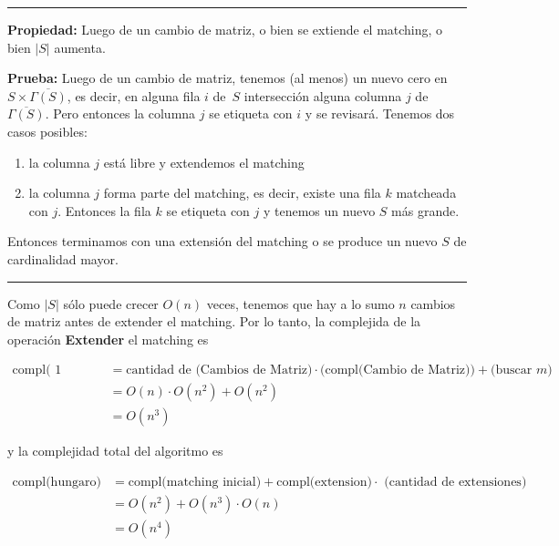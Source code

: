 \documentclass[10pt,a4paper]{article}
\begin{document}
\vspace{0.5cm}\hrule\vspace{0.5cm}
\textbf{Propiedad: }Luego de un cambio de matriz, o bien se extiende el matching, o bien $\lvert S\rvert$ aumenta.

\textbf{Prueba:} Luego de un cambio de matriz, tenemos (al menos) un nuevo cero en $S \times \overline{\Gamma(S)}$, es decir, en alguna fila $i $ de $S$ intersección alguna columna $j$ de $\overline{\Gamma(S)}$. Pero entonces la columna $j$ se etiqueta con $i$ y se revisará. Tenemos dos casos posibles:

\begin{enumerate}

	\item la columna $j$ está libre y extendemos el matching
	\item la columna $j$ forma parte del matching, es decir, existe una fila $k$ matcheada con $j$. Entonces la fila $k$ se etiqueta con $j$ y tenemos un nuevo $S$ más grande.
\end{enumerate}

Entonces terminamos con una extensión del matching o se produce un nuevo $S$ de cardinalidad mayor.

\vspace{0.5cm}\hrule\vspace{0.5cm}
Como $\lvert S \rvert$ sólo puede crecer $O(n)$ veces, tenemos que hay a lo sumo $n$ cambios de matriz antes de extender el matching. Por lo tanto, la complejida de la operación \textbf{Extender} el matching es

\begin{center}
\begin{align*} \text{compl( 1 extension)} &=  \text{cantidad de (Cambios de Matriz)} \cdot \text{(compl(Cambio de Matriz))} + \text{(buscar } m \text{)}\\\ &= O(n) \cdot O(n^2)+ O(n^2)\\ &= O(n^3) \end{align*}
\end{center}

y la complejidad total del algoritmo es

\begin{center}
\begin{align*} \text{compl(hungaro)} &=\text{compl(matching inicial)} + \text{compl(extension)}\cdot  \text{ (cantidad de extensiones})\\ &= O(n^2) + O(n^3) \cdot O (n)\\ &= O(n^4) \end{align*}
\end{center}
\end{document}
